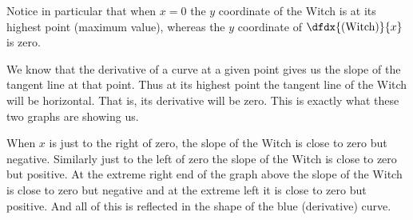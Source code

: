 Notice in particular that when $x=0$ the $y$ coordinate of the Witch
is at its highest point (maximum value), whereas the $y$ coordinate of
$\dfdx{(\text{Witch})}{x}$ is zero.



We know that the derivative of a curve at a given
point gives us the slope of the tangent line at that point. Thus at
its highest point the tangent line of the Witch will be horizontal.
That is, its derivative will be zero. This is exactly what these two
graphs are showing us.

When $x$ is just to the  right of zero, the slope of the
Witch is close to zero but negative. Similarly just to the left of zero the slope
of the Witch is close to zero but positive. At the extreme right end of the
graph above the slope of the Witch is close to zero but negative and at the
extreme left it is close to zero but positive. And all of this is reflected
in the shape of the blue (derivative) curve.

